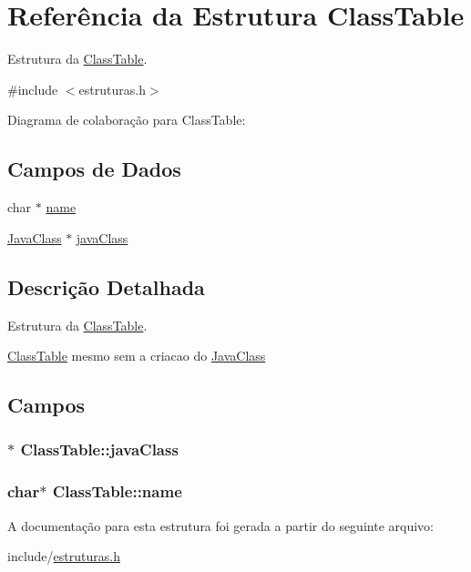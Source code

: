 \hypertarget{struct_class_table}{}\section{Referência da Estrutura Class\+Table}
\label{struct_class_table}


Estrutura da \hyperlink{struct_class_table}{Class\+Table}.  




{\ttfamily \#include $<$estruturas.\+h$>$}



Diagrama de colaboração para Class\+Table\+:
\subsection*{Campos de Dados}
\begin{DoxyCompactItemize}
\item 
char $\ast$ \hyperlink{struct_class_table_acd5b84c549aa0dc5b79750c0fa8525be}{name}
\item 
\hyperlink{struct_java_class}{Java\+Class} $\ast$ \hyperlink{struct_class_table_a32e6ffa41523c58f4f9ac382399832dc}{java\+Class}
\end{DoxyCompactItemize}


\subsection{Descrição Detalhada}
Estrutura da \hyperlink{struct_class_table}{Class\+Table}. 

\hyperlink{struct_class_table}{Class\+Table} mesmo sem a criacao do \hyperlink{struct_java_class}{Java\+Class} 

\subsection{Campos}
\subsubsection[{\texorpdfstring{java\+Class}{javaClass}}]{$\ast$ Class\+Table\+::java\+Class}\hypertarget{struct_class_table_a32e6ffa41523c58f4f9ac382399832dc}{}\label{struct_class_table_a32e6ffa41523c58f4f9ac382399832dc}
\subsubsection[{\texorpdfstring{name}{name}}]{\setlength{\rightskip}{0pt plus 5cm}char$\ast$ Class\+Table\+::name}\hypertarget{struct_class_table_acd5b84c549aa0dc5b79750c0fa8525be}{}\label{struct_class_table_acd5b84c549aa0dc5b79750c0fa8525be}


A documentação para esta estrutura foi gerada a partir do seguinte arquivo\+:\begin{DoxyCompactItemize}
\item 
include/\hyperlink{estruturas_8h}{estruturas.\+h}\end{DoxyCompactItemize}
